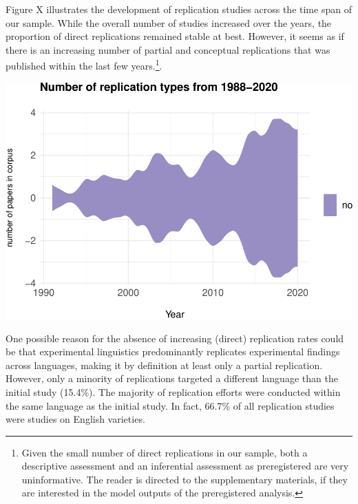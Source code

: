 \documentclass[]{elsarticle} %
\begin{document}
Figure X illustrates the development of replication studies across the
time span of our sample. While the overall number of studies increased
over the years, the proportion of direct replications remained stable at
best. However, it seems as if there is an increasing number of partial
and conceptual replications that was published within the last few
years.\footnote{Given the small number of direct replications in our
  sample, both a descriptive assessment and an inferential assessment as
  preregistered are very uninformative. The reader is directed to the
  supplementary materials, if they are interested in the model outputs
  of the preregistered analysis.}.

\begin{center}\includegraphics[width=1\linewidth]{ReplicationLing_files/figure-latex/steam_plot-1} \end{center}

One possible reason for the absence of increasing (direct) replication
rates could be that experimental linguistics predominantly replicates
experimental findings across languages, making it by definition at least
only a partial replication. However, only a minority of replications
targeted a different language than the initial study (15.4\%). The
majority of replication efforts were conducted within the same language
as the initial study. In fact, 66.7\% of all replication studies were
studies on English varieties.
\end{document}
